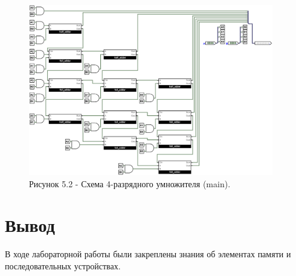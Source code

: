 \documentclass[oneside,a4paper,14pt]{extarticle}
\begin{document}
\begin{figure}[h!]
	\centering
	\includegraphics[width=0.95\textwidth]{pics/5_2.png}
	\caption*{Рисунок 5.2 - Схема 4-разрядного умножителя (main).}
\end{figure}

\newpage
\section*{Вывод}
В ходе лабораторной работы были закреплены знания об элементах памяти и последовательных устройствах.\\
\end{document}
